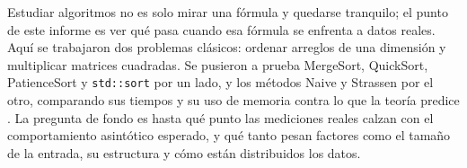 Estudiar algoritmos no es solo mirar una fórmula y quedarse tranquilo; el
punto de este informe es ver qué pasa cuando esa fórmula se enfrenta a datos
reales. Aquí se trabajaron dos problemas clásicos: ordenar arreglos de una
dimensión y multiplicar matrices cuadradas. Se pusieron a prueba MergeSort,
QuickSort, PatienceSort y \texttt{std::sort} por un lado, y los métodos Naive
y Strassen por el otro, comparando sus tiempos y su uso de memoria contra lo
que la teoría predice \cite{taocv3,algorithms_erickson}. La pregunta de fondo
es hasta qué punto las mediciones reales calzan con el comportamiento
asintótico esperado, y qué tanto pesan factores como el tamaño de la
entrada, su estructura y cómo están distribuidos los datos.
